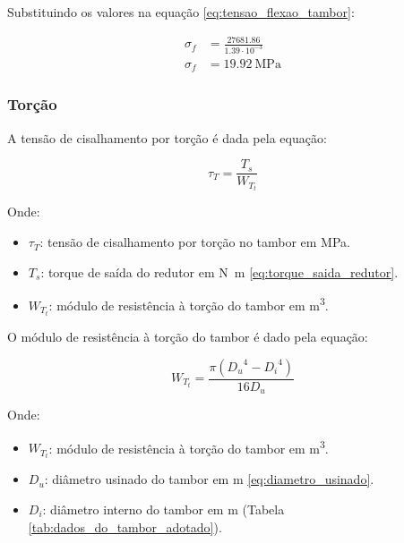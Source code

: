 Substituindo os valores na equação \eqref{eq:tensao_flexao_tambor}:

\begin{align*}
  \sigma_f & = \frac{\num{27681.86}}{\num{1.39} \cdot 10^{-3}} \\
  \sigma_f & = \boxed{\SI{19.92}{\mega\pascal}}
\end{align*}

\subsubsection{Torção}

A tensão de cisalhamento por torção é dada pela equação:

\begin{equation}
  \tau_T = \frac{T_s}{W_{T_t}}
  \label{eq:tensao_cisalhamento_torcao_tambor}
\end{equation}

Onde:

\begin{itemize}
  \item $\tau_T$: tensão de cisalhamento por torção no tambor em \si{\mega\pascal}.
  \item $T_s$: torque de saída do redutor em \si{\newton\meter} \eqref{eq:torque_saida_redutor}.
  \item $W_{T_t}$: módulo de resistência à torção do tambor em \si{\meter\cubed}.
\end{itemize}

\vspace{1em}

O módulo de resistência à torção do tambor é dado pela equação:

\begin{equation}
  W_{T_t} = \frac{\pi \left( {D_u}^4 - {D_i}^4 \right)}{16 D_u}
  \label{eq:modulo_resistencia_torcao_tambor}
\end{equation}

Onde:

\begin{itemize}
  \item $W_{T_t}$: módulo de resistência à torção do tambor em \si{\meter\cubed}.
  \item $D_u$: diâmetro usinado do tambor em \si{\meter} \eqref{eq:diametro_usinado}.
  \item $D_i$: diâmetro interno do tambor em \si{\meter} (Tabela \ref{tab:dados_do_tambor_adotado}).
\end{itemize}

\vspace{1em}

